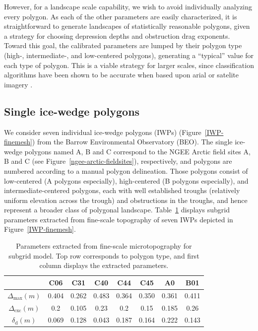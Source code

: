 However, for a landscape scale capability, we wish to avoid individually analyzing every polygon.
As each of the other parameters are easily characterized, it is straightforward to generate landscapes of statistically reasonable polygons, given a strategy for choosing depression depths and obstruction drag exponents.
Toward this goal, the calibrated parameters are lumped by their polygon type (high-, intermediate-, and low-centered polygons), generating a ``typical'' value for each type of polygon.
This is a viable strategy for larger scales, since classification algorithms have been shown to be accurate when based upon arial or satelite imagery \citet{Skurikhin2013}.


%
\FloatBarrier
\subsection{Single ice-wedge polygons}\label{numerical-tests-single}

We consider seven individual ice-wedge polygons (IWPs) (Figure~\ref{IWP-finemesh}) from the Barrow Environmental Observatory (BEO).
The single ice-wedge polygons named A, B and C correspond to the NGEE Arctic field sites A, B and C (see Figure~\ref{ngee-arctic-fieldsites}), respectively, and polygons are numbered according to a manual polygon delineation.
Those polygons consist of low-centered (A polygons especially), high-centered (B polygons especially), and intermediate-centered polygons, each with well established troughs (relatively uniform elevation across the trough) and obstructions in the troughs, and hence represent a broader class of polygonal landscape.
Table~\ref{subgrid-parameters} displays subgrid parameters extracted from fine-scale topography of seven IWPs depicted in Figure~\ref{IWP-finemesh}.
%
\begin{center}
\begin{table}[htbp]
\caption{Parameters extracted from fine-scale microtopography for subgrid model. Top row corresponds to polygon type, and first column displays the extracted parameters.}\label{subgrid-parameters}
\begin{tabular}{| c |c|c|c|c|c|c|c|}
\hline
& C06 & C31 & C40 & C44 & C45 & A0 & B01 \\ \hline
 $\Delta_\text{max}(m)$ & 0.404 & 0.262 & 0.483 & 0.364 & 0.350 & 0.361 & 0.411 \\ \hline
$\Delta_\text{exc}(m)$ & 0.2 & 0.105 & 0.23 & 0.2 & 0.15 & 0.185 & 0.26\\ \hline
$ \delta_\text{d}(m)$ & 0.069 & 0.128 & 0.043 & 0.187 & 0.164 & 0.222 & 0.143 \\ \hline
\end{tabular}
\end{table}
\end{center}%

